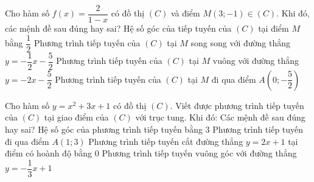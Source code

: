 \begin{ex}%
Cho hàm số $f(x)=\dfrac{2}{1-x}$ có đồ thị $(C)$ và điểm $M(3 ;-1) \in(C)$. Khi đó, các mệnh đề sau đúng hay sai?
\choiceTF
{\True Hệ số góc của tiếp tuyến của $(C)$ tại điểm $M$ bằng $\dfrac{1}{2}$}
{Phương trình tiếp tuyến của $(C)$ tại $M$ song song với đường thẳng $y=-\dfrac{1}{2} x-\dfrac{5}{2}$}
{\True Phương trình tiếp tuyến của $(C)$ tại $M$ vuông với đường thẳng $y=-2 x-\dfrac{5}{2}$}
{\True Phương trình tiếp tuyến của $(C)$ tại $M$ đi qua điểm $A\left(0 ;-\dfrac{5}{2}\right)$}
\end{ex}

\begin{ex}%
Cho hàm số $y=x^2+3 x+1$ có đồ thị $(C)$. Viết được phương trình tiếp tuyến của $(C)$ tại giao điểm của $(C)$ với trục tung. Khi đó:
Các mệnh đề sau đúng hay sai?
\choiceTF
{\True Hệ số góc của phương trình tiếp tuyến bằng $ 3 $}
{Phương trình tiếp tuyến đi qua điểm $A(1 ; 3)$}
{\True Phương trình tiếp tuyến cắt đường thẳng $y=2 x+1$ tại điểm có hoành độ bằng $ 0 $}
{\True Phương trình tiếp tuyến vuông góc với đường thẳng $y=-\dfrac{1}{3} x+1$}
\end{ex}

